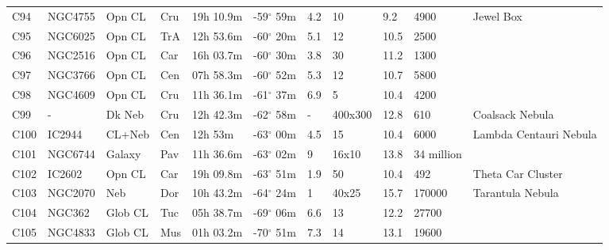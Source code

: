 \documentclass[10pt,twoside,a4paper,english]{article}
\begin{document}
\begin{longtable}{@{}lllllllllll@{}}
C94        & NGC4755     & Opn CL     & Cru       & 19h 10.9m & -59$^{\circ}$ 59m  & 4.2       & 10                   & 9.2      & 4900                & Jewel Box                       \\ 
C95        & NGC6025     & Opn CL     & TrA       & 12h 53.6m & -60$^{\circ}$ 20m  & 5.1       & 12                   & 10.5     & 2500                &                                 \\ 
C96        & NGC2516     & Opn CL     & Car       & 16h 03.7m & -60$^{\circ}$ 30m  & 3.8       & 30                   & 11.2     & 1300                &                                 \\ 
C97        & NGC3766     & Opn CL     & Cen       & 07h 58.3m & -60$^{\circ}$ 52m  & 5.3       & 12                   & 10.7     & 5800                &                                 \\ 
C98        & NGC4609     & Opn CL     & Cru       & 11h 36.1m & -61$^{\circ}$ 37m  & 6.9       & 5                    & 10.4     & 4200                &                                 \\ 
C99        & -           & Dk Neb     & Cru       & 12h 42.3m & -62$^{\circ}$ 58m  & -         & 400x300              & 12.8     & 610                 & Coalsack Nebula                 \\ 
C100       & IC2944      & CL+Neb     & Cen       & 12h 53m   & -63$^{\circ}$ 00m  & 4.5       & 15                   & 10.4     & 6000                & Lambda Centauri Nebula          \\ 
C101       & NGC6744     & Galaxy     & Pav       & 11h 36.6m & -63$^{\circ}$ 02m  & 9         & 16x10                & 13.8     & 34 million          &                                 \\ 
C102       & IC2602      & Opn CL     & Car       & 19h 09.8m & -63$^{\circ}$ 51m  & 1.9       & 50                   & 10.4     & 492                 & Theta Car Cluster               \\ 
C103       & NGC2070     & Neb        & Dor       & 10h 43.2m & -64$^{\circ}$ 24m  & 1         & 40x25                & 15.7     & 170000              & Tarantula Nebula                \\ 
C104       & NGC362      & Glob CL    & Tuc       & 05h 38.7m & -69$^{\circ}$ 06m  & 6.6       & 13                   & 12.2     & 27700               &                                 \\ 
C105       & NGC4833     & Glob CL    & Mus       & 01h 03.2m & -70$^{\circ}$ 51m  & 7.3       & 14                   & 13.1     & 19600               &                                 \\ 

\end{longtable}
\end{document}
